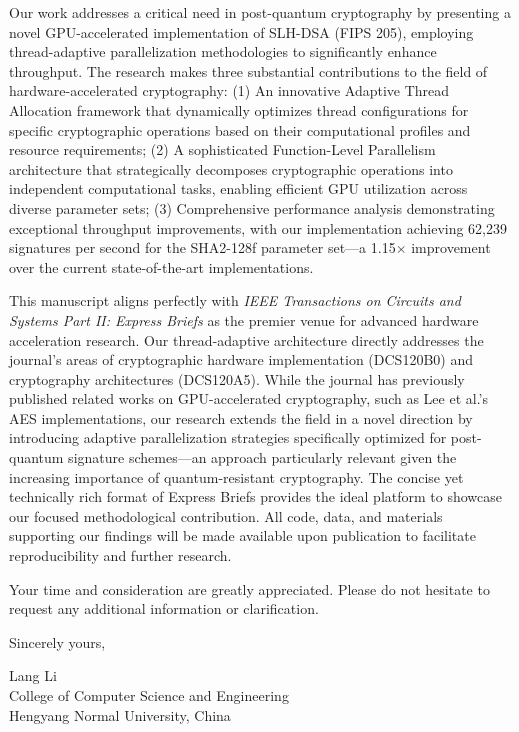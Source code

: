 \documentclass{article}
\begin{document}
Our work addresses a critical need in post-quantum cryptography by presenting a novel GPU-accelerated implementation of SLH-DSA (FIPS 205), employing thread-adaptive parallelization methodologies to significantly enhance throughput. The research makes three substantial contributions to the field of hardware-accelerated cryptography:
(1) An innovative Adaptive Thread Allocation framework that dynamically optimizes thread configurations for specific cryptographic operations based on their computational profiles and resource requirements;
(2) A sophisticated Function-Level Parallelism architecture that strategically decomposes cryptographic operations into independent computational tasks, enabling efficient GPU utilization across diverse parameter sets;
(3) Comprehensive performance analysis demonstrating exceptional throughput improvements, with our implementation achieving 62,239 signatures per second for the SHA2-128f parameter set—a 1.15$\times$ improvement over the current state-of-the-art implementations.

This manuscript aligns perfectly with \textit{IEEE Transactions on Circuits and Systems Part II: Express Briefs} as the premier venue for advanced hardware acceleration research. Our thread-adaptive architecture directly addresses the journal's areas of cryptographic hardware implementation (DCS120B0) and cryptography architectures (DCS120A5). While the journal has previously published related works on GPU-accelerated cryptography, such as Lee et al.'s AES implementations, our research extends the field in a novel direction by introducing adaptive parallelization strategies specifically optimized for post-quantum signature schemes—an approach particularly relevant given the increasing importance of quantum-resistant cryptography. The concise yet technically rich format of Express Briefs provides the ideal platform to showcase our focused methodological contribution. All code, data, and materials supporting our findings will be made available upon publication to facilitate reproducibility and further research.

Your time and consideration are greatly appreciated. Please do not hesitate to request any additional information or clarification.

\bigskip %

Sincerely yours,

\vspace{20pt} %


Lang Li \\
College of Computer Science and Engineering\\
Hengyang Normal University, China \\
\end{document}
